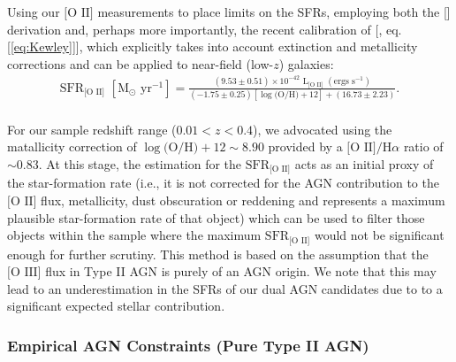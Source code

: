 Using our $\text{[O II]}$ measurements to place limits on the SFRs, employing both the [\cite{Kennicutt_1998}] derivation and, perhaps more importantly, the recent calibration of [\cite{Kewley_2004}, eq. [\ref{eq:Kewley}]], which explicitly takes into account extinction and metallicity corrections and can be applied to near-field (low-$z$) galaxies:
\\
\begin{equation}
\begin{align}
\label{eq:Kewley}
{\text{SFR}}_{\text{[O II]}}\,\,[\text{M}_\odot \text{ yr}^{-1}]=\frac{(9.53\pm{0.51})\times10^{-42}\,\,\text{L}_{\text{[O II]}}\,\,(\text{ergs }\text{s}^{-1})}{(-1.75\pm{0.25})[\log{\text{(O/H)}}+12]+(16.73\pm{2.23})}.
\end{align}
\end{equation}
\\
For our sample redshift range (${{0.01}<{z}<{0.4}}$), we advocated using the \cite{Teplitz_2003} matallicity correction of $\log{\text{(O/H)} +12}\sim{8.90}$ provided by a $\text{[O II]/H}\alpha$ ratio of $\sim{0.83}$. At this stage, the \cite{Kennicutt_1998} estimation for the $\text{SFR}_{\text{[O II]}}$ acts as an initial proxy of the star-formation rate (i.e., it is not corrected for the AGN contribution to the $\text{[O II]}$ flux, metallicity, dust obscuration or reddening and represents a maximum plausible star-formation rate of that object) which can be used to filter those objects within the sample where the maximum $\text{SFR}_{\text{[O II]}}$ would not be significant enough for further scrutiny. This method is based on the assumption that the $\text{[O III]}$ flux in Type II AGN is purely of an AGN origin. We note that this may lead to an underestimation in the SFRs of our dual AGN candidates due to to a significant expected stellar contribution.  

\subsubsection{Empirical AGN Constraints (Pure Type II AGN)}

